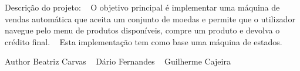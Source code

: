 Descrição do projeto\+: ~\newline
O objetivo principal é implementar uma máquina de vendas automática que aceita um conjunto de moedas e permite que o utilizador navegue pelo menu de produtos disponíveis, compre um produto e devolva o crédito final. ~\newline
Esta implementação tem como base uma máquina de estados. ~\newline
\begin{DoxyAuthor}{Author}
Beatriz Carvas ~\newline
 Dário Fernandes ~\newline
 Guilherme Cajeira 
\end{DoxyAuthor}
